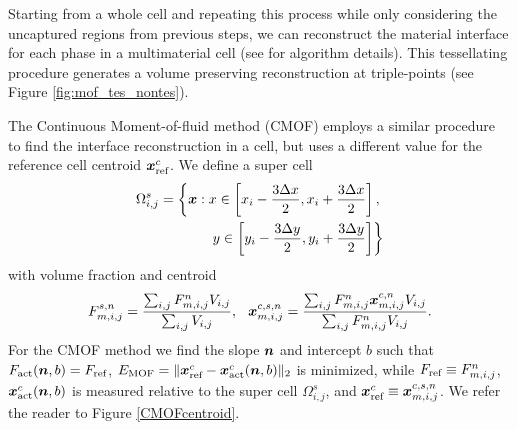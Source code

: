 \documentclass[]{article}
\newcommand{\tn}{\textnormal}
\newcommand{\bmx}{\mbox{\boldmath $x$\unboldmath}}
\newcommand{\bmn}{\mbox{\boldmath $n$\unboldmath}}
\begin{document}
Starting from a whole cell and repeating this process 
while only considering the uncaptured regions from previous 
steps, we can reconstruct the material interface for 
each phase in a multimaterial cell (see \cite{li2015multiphase} 
for algorithm details). This tessellating procedure 
generates a volume preserving reconstruction 
at triple-points (see Figure \ref{fig:mof_tes_nontes}).

The Continuous Moment-of-fluid method (CMOF) employs a similar 
procedure to find the interface reconstruction in a cell, 
but uses a different value for the reference cell 
centroid $\bmx_\tn{ref}^c$. We define a super cell 
\begin{eqnarray}
  \label{eq:super_cell_def}
  \Omega_{i,j}^s = 
\left\{ \bmx: x \in \left[x_i-\frac{3\Delta x}{2}, x_i+\frac{3\Delta x}{2}\right],\right.\\
\left. y \in \left[ y_i-\frac{3\Delta y}{2}, y_i+\frac{3\Delta y}{2}\right] \right\}
\end{eqnarray}
with volume fraction and centroid
\begin{equation}
\label{eq:super_cell_f_x}
F_{m,i,j}^{s,n} = \frac{\sum_{i,j} F_{m,i,j}^n V_{i,j}}{\sum_{i,j} V_{i,j}}, 
\hspace{0.25cm}
\bmx_{m,i,j}^{c,s,n} = 
\frac{\sum_{i,j} F_{m,i,j}^n \bmx_{m,i,j}^{c,n} V_{i,j}}
     {\sum_{i,j} F_{m,i,j}^n V_{i,j}}.
\end{equation}
For the CMOF method we find the slope $\bmn$ and intercept $b$ such that 
$F_\tn{act}(\bmn,b) = F_\tn{ref}$, 
$E_\tn{MOF} = \lVert \bmx_\tn{ref}^c - \bmx_\tn{act}^c(\bmn,b) \rVert_2$ 
is minimized, while 
$F_\tn{ref} \equiv F_{m,i,j}^{n}$, 
$\bmx_\tn{act}^c(\bmn,b)$ is measured relative to the super cell 
$\Omega_{i,j}^s$,
and 
$\bmx_\tn{ref}^c \equiv \bmx_{m,i,j}^{c,s,n}$.
We refer the reader to Figure \ref{CMOFcentroid}.
\end{document}
